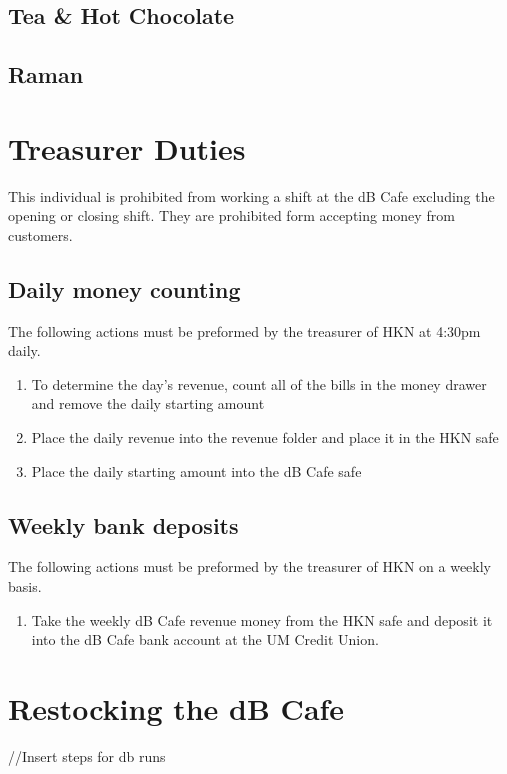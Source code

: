 \documentclass[12pt,onecolumn,letterpaper]{article}
\begin{document}
\subsection{Tea \& Hot Chocolate}
\subsection{Raman}

\section{Treasurer Duties}
This individual is prohibited from working a shift at the dB Cafe excluding the opening or closing shift. They are prohibited form accepting money from customers. 
\subsection{Daily money counting}
The following actions must be preformed by the treasurer of HKN at 4:30pm daily. 
\begin{enumerate}
\item To determine the day's revenue, count all of the bills in the money drawer and remove the daily starting amount
\item Place the daily revenue into the revenue folder and place it in the HKN safe
\item Place the daily starting amount into the dB Cafe safe
\end{enumerate}
\subsection{Weekly bank deposits}
The following actions must be preformed by the treasurer of HKN on a weekly basis.
\begin{enumerate}
\item Take the weekly dB Cafe revenue money from the HKN safe and deposit it into the dB Cafe bank account at the UM Credit Union.
\end{enumerate}

\section{Restocking the dB Cafe}
//Insert steps for db runs
\end{document}
